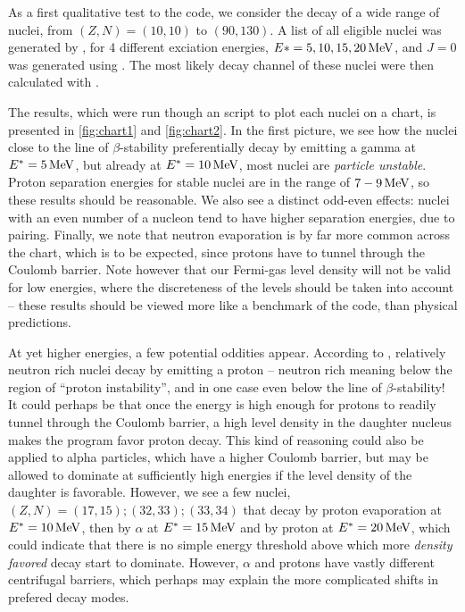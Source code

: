 As a first qualitative test to the code, we consider the decay of a wide range of nuclei, from $(Z,N)=(10,10)$ to $(90,130)$.
A list of all eligible nuclei was generated by , for 4 different exciation energies, $E*=\unit[5, 10, 15, 20]{MeV}$, and $J=0$ was generated using . The most likely decay channel of these nuclei were then calculated with .

The results, which were run though an  script to plot each nuclei on a chart, is presented in \autoref{fig:chart1} and \autoref{fig:chart2}. In the first picture, we see how the nuclei close to the line of $\beta$-stability preferentially decay by emitting a gamma at $E^*=\unit[5]{MeV}$, but already at $E^*=\unit[10]{MeV}$, most nuclei are \emph{particle unstable}. Proton separation energies for stable nuclei are in the range of $\unit[7-9]{MeV}$\cite{audi:1995}, so these results should be reasonable.
We also see a distinct odd-even effects: nuclei with an even number of a nucleon tend to have higher separation energies, due to pairing. Finally, we note that neutron evaporation is by far more common across the chart, which is to be expected, since protons have to tunnel through the Coulomb barrier. %
Note however that our Fermi-gas level density will not be valid for low energies, where the discreteness of the levels should be taken into account -- these results should be viewed more like a benchmark of the code, than physical predictions.

At yet higher energies, a few potential oddities appear. According to \codename{}, relatively neutron rich nuclei decay by emitting a proton -- neutron rich meaning below the region of ``proton instability'', and in one case even below the line of $\beta$-stability!
It could perhaps be that once the energy is high enough for protons to readily tunnel through the Coulomb barrier, a high level density in the daughter nucleus makes the program favor proton decay. 
This kind of reasoning could also be applied to alpha particles, which have a higher Coulomb barrier, but may be allowed to dominate at sufficiently high energies if the level density of the daughter is favorable. However, we see a few nuclei, $(Z,N)=(17,15); (32,33); (33,34)$ that decay by proton evaporation at $E^*=\unit[10]{MeV}$, then by $\alpha$ at $E^*=\unit[15]{MeV}$ and by proton at $E^*=\unit[20]{MeV}$, which could indicate that there is no simple energy threshold above which more \emph{density favored} decay start to dominate. However, $\alpha$ and protons have vastly different centrifugal barriers, which perhaps may explain the more complicated shifts in prefered decay modes.

